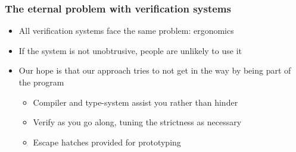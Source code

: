 \documentclass[compress,handout]{beamer}
\begin{document}
\begin{frame}
  \frametitle{The eternal problem with verification systems}

  \begin{itemize}
    \item<1-> All verification systems face the same problem: ergonomics
    \item<2-> If the system is not unobtrusive, people are unlikely to use it
    \item<3-> Our hope is that our approach tries to not get in the way by being
              part of the program
      \begin{itemize}
        \item<4-> Compiler and type-system assist you rather than hinder
        \item<5-> Verify as you go along, tuning the strictness as necessary
        \item<6-> Escape hatches provided for prototyping
      \end{itemize}
  \end{itemize}

\end{frame}
\end{document}
